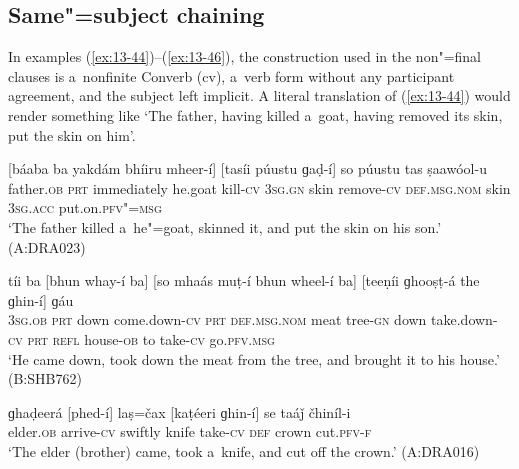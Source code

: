 \subsection{Same"=subject chaining}
\label{subsec:13-3-1}

In examples (\ref{ex:13-44})--(\ref{ex:13-46}), the construction used in the non"=final clauses is a~nonfinite Converb (cv), a~verb form without any participant agreement, and the subject left implicit. A literal translation of (\ref{ex:13-44}) would render something like `The father, having killed a~goat, having removed its skin, put the skin on him'. 

\begin{exe}
\ex
\label{ex:13-44}
\gll \label{bkm:Ref190770484}[báaba ba yakdám bhíiru mheer-í] [tasíi púustu ɡaḍ-í] so púustu tas ṣaawóol-u  \\
father.\textsc{ob} \textsc{prt} immediately he.goat kill-\textsc{cv} \textsc{3sg.gn} skin  remove-\textsc{cv} \textsc{def.msg.nom} skin \textsc{3sg.acc} put.on.\textsc{pfv"=msg} \\
\glt `The father killed a~he"=goat, skinned it, and put the skin on his son.' (A:DRA023)

\ex
\label{ex:13-45}
\gll tíi ba [bhun whay-í ba] [so  mhaás muṭ-í bhun wheel-í ba] [teeṇíi
  ɡhooṣṭ-á the ɡhin-í] ɡáu \\
\textsc{3sg.ob} \textsc{prt} down come.down-\textsc{cv} \textsc{prt} \textsc{def.msg.nom}  meat tree-\textsc{gn} down take.down-\textsc{cv} \textsc{prt} \textsc{refl} house-\textsc{ob}  to take-\textsc{cv} go.\textsc{pfv.msg} \\
\glt `He came down, took down the meat from the tree, and brought it to his house.' (B:SHB762)

\ex
\label{ex:13-46}
\gll ɡhaḍeerá [phed-í] laṣ=čax [kaṭéeri ɡhin-í] se taáǰ čhiníl-i  \\
elder.\textsc{ob} arrive-\textsc{cv} swiftly knife take-\textsc{cv} \textsc{def} crown cut.\textsc{pfv-f} \\
\glt `The elder (brother) came, took a~knife, and cut off the crown.' (A:DRA016) 
\end{exe}

